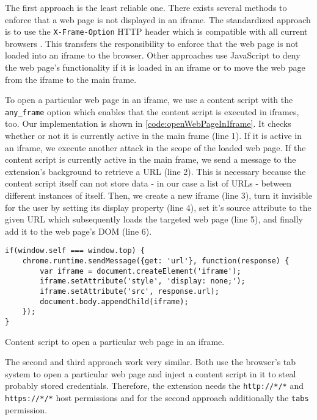 	The first approach is the least reliable one. There exists several methods to enforce that a web page is not displayed in an iframe. The standardized approach is to use the \texttt{X-Frame-Option} HTTP header which is compatible with all current browsers \cite{xFrameOptionsSpezification, xFrameOptionsCompability}. This transfers the responsibility to enforce that the web page is not loaded into an iframe to the browser. Other approaches use JavaScript to deny the web page's functionality if it is loaded in an iframe or to move the web page from the iframe to the main frame. %
		
	To open a particular web page in an iframe, we use a content script with the \texttt{any\_frame} option which enables that the content script is executed in iframes, too. Our implementation is shown in \autoref{code:openWebPageInIframe}. It checks whether or not it is currently active in the main frame (line 1). If it is active in an iframe, we execute another attack in the scope of the loaded web page. If the content script is currently active in the main frame, we send a message to the extension's background to retrieve a URL (line 2). This is necessary because the content script itself can not store data - in our case a list of URLs - between different instances of itself. Then, we create a new iframe (line 3), turn it invisible for the user by setting its display property (line 4), set it's source attribute to the given URL which subsequently loads the targeted web page (line 5), and finally add it to the web page's DOM (line 6). 
	
	\begin{code}
		\begin{lstlisting}
if(window.self === window.top) {
	chrome.runtime.sendMessage({get: 'url'}, function(response) {
		var iframe = document.createElement('iframe');
		iframe.setAttribute('style', 'display: none;');
		iframe.setAttribute('src', response.url);
		document.body.appendChild(iframe);
	});
}
\end{lstlisting}
		\caption{Content script to open a particular web page in an iframe.}
		\label{code:openWebPageInIframe}
	\end{code}
	
	The second and third approach work very similar. Both use the browser's tab system to open a particular web page and inject a content script in it to steal probably stored credentials. Therefore, the extension needs the \texttt{http://*/*} and \texttt{https://*/*} host permissions and for the second approach additionally the \texttt{tabs} permission. 
	
